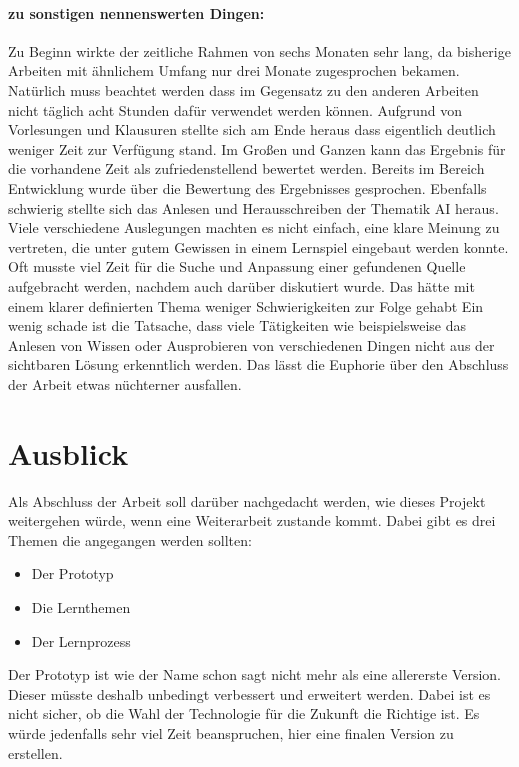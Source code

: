 \paragraph{zu sonstigen nennenswerten Dingen:}
Zu Beginn wirkte der zeitliche Rahmen von sechs Monaten sehr lang, da bisherige Arbeiten mit ähnlichem Umfang nur drei Monate zugesprochen bekamen. Natürlich muss beachtet werden dass im Gegensatz zu den anderen Arbeiten nicht täglich acht Stunden dafür verwendet werden können. Aufgrund von Vorlesungen und Klausuren stellte sich am Ende heraus dass eigentlich deutlich weniger Zeit zur Verfügung stand. Im Großen und Ganzen kann das Ergebnis für die vorhandene Zeit als zufriedenstellend bewertet werden. Bereits im Bereich Entwicklung wurde über die Bewertung des Ergebnisses gesprochen.
Ebenfalls schwierig stellte sich das Anlesen und Herausschreiben der Thematik AI heraus. Viele verschiedene Auslegungen machten es nicht einfach, eine klare Meinung zu vertreten, die unter gutem Gewissen in einem Lernspiel eingebaut werden konnte. Oft musste viel Zeit für die Suche und Anpassung einer gefundenen Quelle aufgebracht werden, nachdem auch darüber diskutiert wurde. Das hätte mit einem klarer definierten Thema weniger Schwierigkeiten zur Folge gehabt
Ein wenig schade ist die Tatsache, dass viele Tätigkeiten wie beispielsweise das Anlesen von Wissen oder Ausprobieren von verschiedenen Dingen nicht aus der sichtbaren Lösung erkenntlich werden. Das lässt die Euphorie über den Abschluss der Arbeit etwas nüchterner ausfallen.

\section{Ausblick}

Als Abschluss der Arbeit soll darüber nachgedacht werden, wie dieses Projekt weitergehen würde, wenn eine Weiterarbeit zustande kommt. Dabei gibt es drei Themen die angegangen werden sollten:

\begin{itemize}
\item Der Prototyp
\item Die Lernthemen
\item Der Lernprozess
\end{itemize}

Der Prototyp ist wie der Name schon sagt nicht mehr als eine allererste Version. Dieser müsste deshalb unbedingt verbessert und erweitert werden. Dabei ist es nicht sicher, ob die Wahl der Technologie für die Zukunft die Richtige ist. Es würde jedenfalls sehr viel Zeit beanspruchen, hier eine finalen Version zu erstellen.

